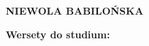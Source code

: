 \documentclass[10pt,a4paper,oneside]{article}
\begin{document}
\centerline{\textbf{\MakeUppercase{Niewola Babilońska}}}
\begin{center}
\textbf{Wersety do studium:} 
\end{center}
\end{document}
